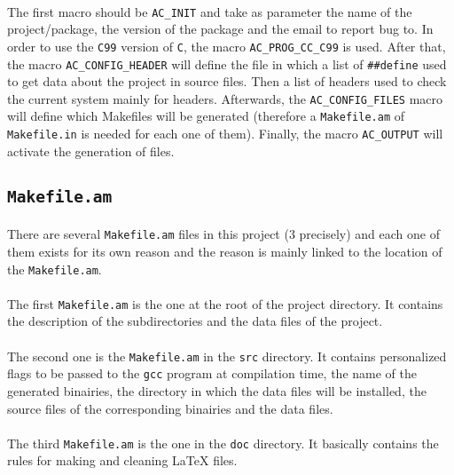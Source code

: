 \documentclass{report}
\begin{document}
\paragraph{} The first macro should be \texttt{AC_INIT} and take as parameter
the name of the project/package, the version of the package and the email to
report bug to. In order to use the \texttt{C99} version of \texttt{C}, the
macro \texttt{AC_PROG_CC_C99} is used. After that, the macro
\texttt{AC_CONFIG_HEADER} will define the file in which a list of
\lstinline[style=prog]|##define| used to get data about the project in source
files. Then a list of headers used to check the current system mainly for
headers. Afterwards, the \texttt{AC_CONFIG_FILES} macro will define which
Makefiles will be generated (therefore a \texttt{Makefile.am} of
\texttt{Makefile.in} is needed for each one of them). Finally, the macro
\texttt{AC_OUTPUT} will activate the generation of files.

\subsection{\texttt{Makefile.am}}

\paragraph{} There are several \texttt{Makefile.am} files in this project (3
precisely) and each one of them exists for its own reason and the reason is
mainly linked to the location of the \texttt{Makefile.am}.

\paragraph{} The first \texttt{Makefile.am} is the one at the root of the
project directory. It contains the description of the subdirectories and the
data files of the project.

\paragraph{} The second one is the \texttt{Makefile.am} in the \texttt{src}
directory. It contains personalized flags to be passed to the \texttt{gcc}
program at compilation time, the name of the generated binairies, the directory
in which the data files will be installed, the source files of the
corresponding binairies and the data files.

\paragraph{} The third \texttt{Makefile.am} is the one in the \texttt{doc}
directory. It basically contains the rules for making and cleaning \LaTeX
files.
\end{document}
